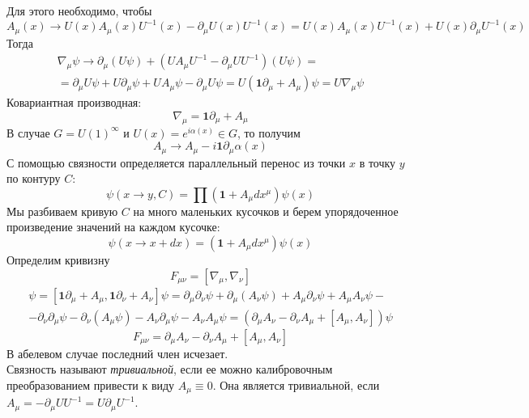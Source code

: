 \documentclass[12pt]{article}
\theoremstyle{definition}
\begin{document}
Для этого необходимо, чтобы
\begin{equation}
    A_\mu(x)\rightarrow U(x)A_\mu(x)U^{-1}(x)-\partial_\mu U(x)U^{-1}(x)=U(x)A_\mu(x)U^{-1}(x)+U(x)\partial_\mu U^{-1}(x)
\end{equation}
Тогда
\begin{multline}
    \nabla_\mu\psi\rightarrow\partial_\mu(U\psi)+(UA_\mu U^{-1}-\partial_\mu UU^{-1})(U\psi)=\\=\partial_\mu U\psi+U\partial_\mu\psi+UA_\mu\psi-\partial_\mu U\psi=U(\bm{1}\partial_\mu+A_\mu)\psi=U\nabla_\mu\psi
\end{multline}
Ковариантная производная:
\begin{equation}
    \nabla_\mu=\bm{1}\partial_\mu+A_\mu
\end{equation}
В случае $G=U(1)^\infty$ и $U(x)=e^{i\alpha(x)}\in G$, то получим
\begin{equation}
    A_\mu\rightarrow A_\mu-i\bm{1}\partial_\mu\alpha(x)
\end{equation}
С помощью связности определяется параллельный перенос из точки $x$ в точку $y$ по контуру $C$:
\begin{equation}
    \psi(x\rightarrow y,C)=\prod(\bm{1}+A_\mu dx^\mu)\psi(x)
\end{equation}
Мы разбиваем кривую $C$ на много маленьких кусочков и берем упорядоченное произведение значений на каждом кусочке:
\begin{equation}
    \psi(x\rightarrow x+dx)=(\bm{1}+A_\mu dx^\mu)\psi(x)
\end{equation}
Определим кривизну
\begin{equation}
    F_{\mu\nu}=[\nabla_\mu,\nabla_\nu]
\end{equation}
\begin{multline}
    [\nabla_\mu,\nabla_\nu]\psi=[\bm{1}\partial_\mu+A_\mu,\bm{1}\partial_\nu+A_\nu]\psi=\partial_\mu\partial_\nu\psi+\partial_\mu(A_\nu\psi)+A_\mu\partial_\nu\psi+A_\mu A_\nu\psi-\\-\partial_\nu\partial_\mu\psi-\partial_\nu(A_\mu\psi)-A_\nu\partial_\mu\psi-A_\nu A_\mu\psi=(\partial_\mu A_\nu-\partial_\nu A_\mu+[A_\mu, A_\nu])\psi
\end{multline}
\begin{equation}
    F_{\mu\nu}=\partial_\mu A_\nu-\partial_\nu A_\mu+[A_\mu, A_\nu]
\end{equation}
В абелевом случае последний член исчезает.\\
Связность называют \textit{тривиальной}, если ее можно калибровочным преобразованием привести к виду $A_\mu \equiv 0$. Она является тривиальной, если $A_\mu=-\partial_\mu UU^{-1}=U\partial_\mu U^{-1}$.\\
\end{document}
